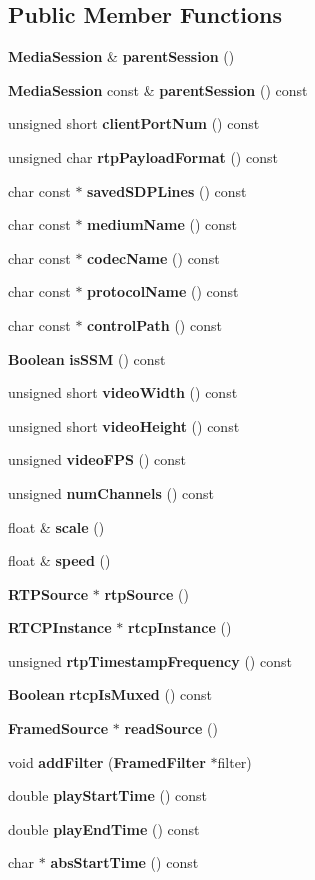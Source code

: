 \subsection*{Public Member Functions}
\begin{DoxyCompactItemize}
\item 
{\bf Media\+Session} \& {\bf parent\+Session} ()
\item 
{\bf Media\+Session} const \& {\bf parent\+Session} () const 
\item 
unsigned short {\bf client\+Port\+Num} () const 
\item 
unsigned char {\bf rtp\+Payload\+Format} () const 
\item 
char const $\ast$ {\bf saved\+S\+D\+P\+Lines} () const 
\item 
char const $\ast$ {\bf medium\+Name} () const 
\item 
char const $\ast$ {\bf codec\+Name} () const 
\item 
char const $\ast$ {\bf protocol\+Name} () const 
\item 
char const $\ast$ {\bf control\+Path} () const 
\item 
{\bf Boolean} {\bf is\+S\+S\+M} () const 
\item 
unsigned short {\bf video\+Width} () const 
\item 
unsigned short {\bf video\+Height} () const 
\item 
unsigned {\bf video\+F\+P\+S} () const 
\item 
unsigned {\bf num\+Channels} () const 
\item 
float \& {\bf scale} ()
\item 
float \& {\bf speed} ()
\item 
{\bf R\+T\+P\+Source} $\ast$ {\bf rtp\+Source} ()
\item 
{\bf R\+T\+C\+P\+Instance} $\ast$ {\bf rtcp\+Instance} ()
\item 
unsigned {\bf rtp\+Timestamp\+Frequency} () const 
\item 
{\bf Boolean} {\bf rtcp\+Is\+Muxed} () const 
\item 
{\bf Framed\+Source} $\ast$ {\bf read\+Source} ()
\item 
void {\bf add\+Filter} ({\bf Framed\+Filter} $\ast$filter)
\item 
double {\bf play\+Start\+Time} () const 
\item 
double {\bf play\+End\+Time} () const 
\item 
char $\ast$ {\bf abs\+Start\+Time} () const 
\item 

\end{DoxyCompactItemize}
